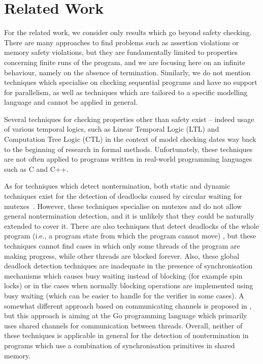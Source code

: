 \section{Related Work} \label{sec:related}

For the related work, we consider only results which go beyond safety checking.
There are many approaches to find problems such as assertion violations or memory safety violations, but they are fundamentally limited to properties concerning finite runs of the program, and we are focusing here on an infinite behaviour, namely on the absence of termination.
Similarly, we do not mention techniques which specialise on checking sequential programs and have no support for parallelism, as well as techniques which are tailored to a specific modelling language and cannot be applied in general.

Several techniques for checking properties other than safety exist -- indeed
usage of various temporal logics, such as Linear Temporal Logic (LTL)
\cite[Chapter 5]{PoMC} and Computation Tree Logic (CTL) \cite[Chapter 6]{PoMC} in the context of model checking dates way back to the beginning of research in formal methods.
Unfortunately, these techniques are not often applied to programs written in real-world programming languages such as C and C++.

As for techniques which detect nontermination, both static and dynamic
techniques exist for the detection of deadlocks caused by circular waiting for
mutexes~\cite{CC14,agarwal2010detection,bensalem2005scalable}.
However, these techniques specialise on mutexes and do not allow general nontermination detection, and it is unlikely that they could be naturally extended to cover it.
There are also techniques that detect deadlocks of the whole program (i.e., a program state from which the program cannot move) \cite{Chaki2005,Demartini99}, but these techniques cannot find cases in which only some threads of the program are making progress, while other threads are blocked forever.
Also, these global deadlock detection techniques are inadequate in the presence of synchronisation mechanisms which causes busy waiting instead of blocking (for example spin locks) or in the cases when normally blocking operations are implemented using busy waiting (which can be easier to handle for the verifier in some cases).
A somewhat different approach based on communicating channels is proposed in \cite{Ng2016}, but this approach is aiming at the Go programming language which primarily uses shared channels for communication between threads.
Overall, neither of these techniques is applicable in general for the detection of nontermination in programs which use a combination of synchronisation primitives in shared memory.

